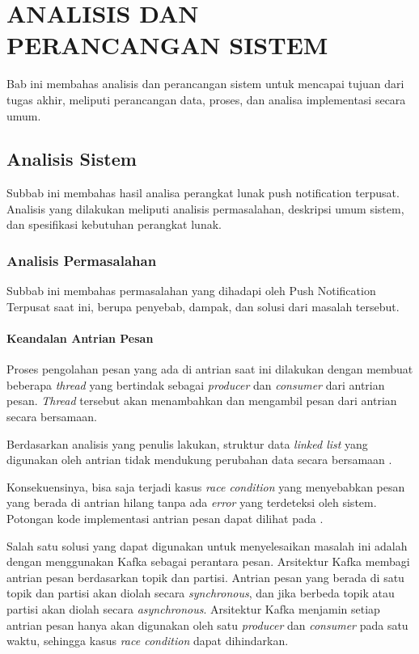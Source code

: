 \chapter{ANALISIS DAN PERANCANGAN SISTEM}
\par Bab ini membahas analisis dan perancangan sistem untuk mencapai tujuan dari tugas akhir, meliputi perancangan data, proses, dan analisa implementasi secara umum.

\section{Analisis Sistem}
\par Subbab ini membahas hasil analisa perangkat lunak push notification terpusat.
Analisis yang dilakukan meliputi analisis permasalahan, deskripsi umum sistem, dan spesifikasi kebutuhan perangkat lunak.

\subsection{Analisis Permasalahan}
\par Subbab ini membahas permasalahan yang dihadapi oleh Push Notification Terpusat saat ini, berupa penyebab, dampak, dan solusi dari masalah tersebut.

\subsubsection{Keandalan Antrian Pesan}
\par Proses pengolahan pesan yang ada di antrian saat ini dilakukan dengan membuat beberapa \textit{thread} yang bertindak sebagai \textit{producer} dan \textit{consumer} dari antrian pesan. \textit{Thread} tersebut akan menambahkan dan mengambil pesan dari antrian secara bersamaan.
\par Berdasarkan analisis yang penulis lakukan, struktur data \textit{linked list} yang digunakan oleh antrian tidak mendukung perubahan data secara bersamaan \cite{linkedlist-online}.
\par Konsekuensinya, bisa saja terjadi kasus \textit{race condition} yang menyebabkan pesan yang berada di antrian hilang tanpa ada \textit{error} yang terdeteksi oleh sistem. Potongan kode implementasi antrian pesan dapat dilihat pada .
\par Salah satu solusi yang dapat digunakan untuk menyelesaikan masalah ini adalah dengan menggunakan Kafka sebagai perantara pesan. Arsitektur Kafka membagi antrian pesan berdasarkan topik dan partisi. Antrian pesan yang berada di satu topik dan partisi akan diolah secara \textit{synchronous}, dan jika berbeda topik atau partisi akan diolah secara \textit{asynchronous}. Arsitektur Kafka menjamin setiap antrian pesan hanya akan digunakan oleh satu \textit{producer} dan \textit{consumer} pada satu waktu, sehingga kasus \textit{race condition} dapat dihindarkan.

